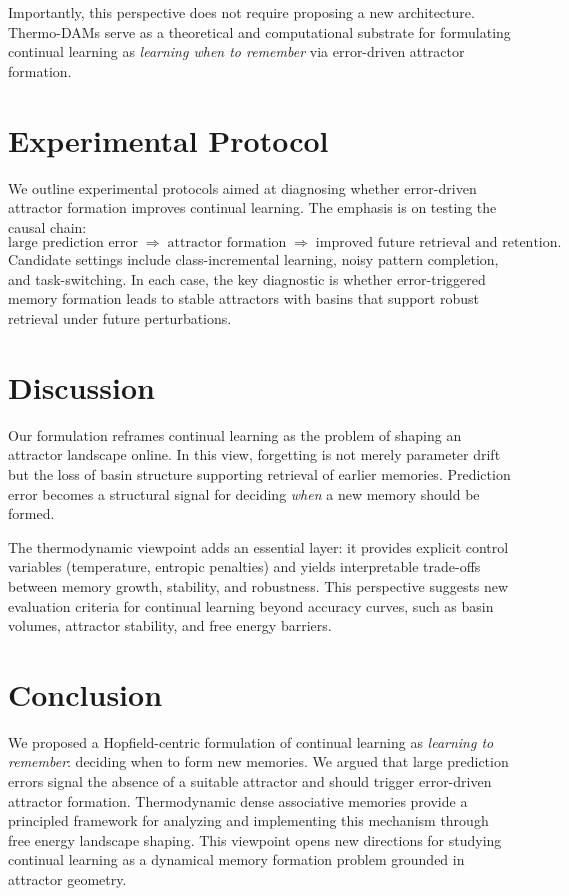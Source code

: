 \documentclass[11pt,a4paper]{article}
\begin{document}
Importantly, this perspective does not require proposing a new architecture.
Thermo-DAMs serve as a theoretical and computational substrate for formulating continual learning as \emph{learning when to remember} via error-driven attractor formation.

\section{Experimental Protocol}
\label{sec:protocol}

We outline experimental protocols aimed at diagnosing whether error-driven attractor formation improves continual learning.
The emphasis is on testing the causal chain:
\[
\text{large prediction error} \;\Rightarrow\; \text{attractor formation} \;\Rightarrow\; \text{improved future retrieval and retention}.
\]
Candidate settings include class-incremental learning, noisy pattern completion, and task-switching.
In each case, the key diagnostic is whether error-triggered memory formation leads to stable attractors with basins that support robust retrieval under future perturbations.

\section{Discussion}

Our formulation reframes continual learning as the problem of shaping an attractor landscape online.
In this view, forgetting is not merely parameter drift but the loss of basin structure supporting retrieval of earlier memories.
Prediction error becomes a structural signal for deciding \emph{when} a new memory should be formed.

The thermodynamic viewpoint adds an essential layer: it provides explicit control variables (temperature, entropic penalties) and yields interpretable trade-offs between memory growth, stability, and robustness.
This perspective suggests new evaluation criteria for continual learning beyond accuracy curves, such as basin volumes, attractor stability, and free energy barriers.

\section{Conclusion}

We proposed a Hopfield-centric formulation of continual learning as \emph{learning to remember}: deciding when to form new memories.
We argued that large prediction errors signal the absence of a suitable attractor and should trigger error-driven attractor formation.
Thermodynamic dense associative memories provide a principled framework for analyzing and implementing this mechanism through free energy landscape shaping.
This viewpoint opens new directions for studying continual learning as a dynamical memory formation problem grounded in attractor geometry.


% 
\end{document}
